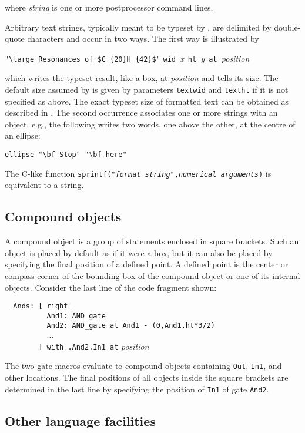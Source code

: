 \noindent where {\sl string} is one or more postprocessor command lines.

Arbitrary text strings, typically meant to be typeset by \latex, are
delimited by double-quote characters and occur in two ways.  The first
way is illustrated by

\verb|"\large Resonances of $C_{20}H_{42}$"|
 \verb|wid |{\sl x}\verb| ht |{\sl y}\verb| at |{\sl position}

\noindent
which writes the typeset result, like a box, at {\sl position} and tells
\pic its size.  The default size assumed by \pic is given by parameters
{\tt textwid} and {\tt textht} if it is not specified as above.
The exact typeset size of formatted text can be obtained
as described in .  The second occurrence
associates one or more strings with an object, e.g., the following writes
two words, one above the other, at the centre of an ellipse:

\verb|ellipse "\bf Stop" "\bf here"|

\noindent
The C-like \pic function
 {\tt sprintf("{\sl format string}",{\sl numerical arguments})}
is equivalent to a string.

\subsection{Compound objects\label{Compoundobjects:}}
A compound object is a group of statements enclosed in square
brackets.  Such an object is placed by default as if it were a box, but
it can also be placed by specifying the final position of a defined point.
A defined point is the center or compass corner of the bounding box
of the compound object or one of its internal objects.
Consider the last line of the code fragment shown:

\noindent%
\verb|  Ands: [ right_|\\
\verb|          And1: AND_gate|\\
\verb|          And2: AND_gate at And1 - (0,And1.ht*3/2)|\\
\verb|          |$\ldots$\\
\verb|        ] with .And2.In1 at| {\sl position} %

The two gate macros evaluate to compound objects containing {\tt Out},
{\tt In1}, and other locations.  The final positions of all objects
inside the square brackets are determined in the last line by
specifying the position of {\tt In1} of gate {\tt And2}.

\subsection{Other language facilities\label{Otherlanguage:}}

